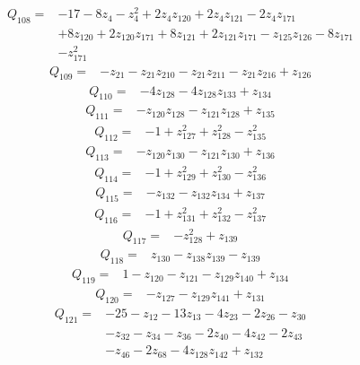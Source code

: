 \[\begin{aligned}Q_{108}={}&-17-8z_{4}-z_{4}^{2}+2z_{4}z_{120}+2z_{4}z_{121}-2z_{4}z_{171}
\\&+8z_{120}+2z_{120}z_{171}+8z_{121}+2z_{121}z_{171}-z_{125}z_{126}-8z_{171}
\\&-z_{171}^{2}
\end{aligned}\]
\[\begin{aligned}Q_{109}={}&-z_{21}-z_{21}z_{210}-z_{21}z_{211}-z_{21}z_{216}+z_{126}
\end{aligned}\]
\[\begin{aligned}Q_{110}={}&-4z_{128}-4z_{128}z_{133}+z_{134}
\end{aligned}\]
\[\begin{aligned}Q_{111}={}&-z_{120}z_{128}-z_{121}z_{128}+z_{135}
\end{aligned}\]
\[\begin{aligned}Q_{112}={}&-1+z_{127}^{2}+z_{128}^{2}-z_{135}^{2}
\end{aligned}\]
\[\begin{aligned}Q_{113}={}&-z_{120}z_{130}-z_{121}z_{130}+z_{136}
\end{aligned}\]
\[\begin{aligned}Q_{114}={}&-1+z_{129}^{2}+z_{130}^{2}-z_{136}^{2}
\end{aligned}\]
\[\begin{aligned}Q_{115}={}&-z_{132}-z_{132}z_{134}+z_{137}
\end{aligned}\]
\[\begin{aligned}Q_{116}={}&-1+z_{131}^{2}+z_{132}^{2}-z_{137}^{2}
\end{aligned}\]
\[\begin{aligned}Q_{117}={}&-z_{128}^{2}+z_{139}
\end{aligned}\]
\[\begin{aligned}Q_{118}={}&z_{130}-z_{138}z_{139}-z_{139}
\end{aligned}\]
\[\begin{aligned}Q_{119}={}&1-z_{120}-z_{121}-z_{129}z_{140}+z_{134}
\end{aligned}\]
\[\begin{aligned}Q_{120}={}&-z_{127}-z_{129}z_{141}+z_{131}
\end{aligned}\]
\[\begin{aligned}Q_{121}={}&-25-z_{12}-13z_{13}-4z_{23}-2z_{26}-z_{30}
\\&-z_{32}-z_{34}-z_{36}-2z_{40}-4z_{42}-2z_{43}
\\&-z_{46}-2z_{68}-4z_{128}z_{142}+z_{132}
\end{aligned}\]
